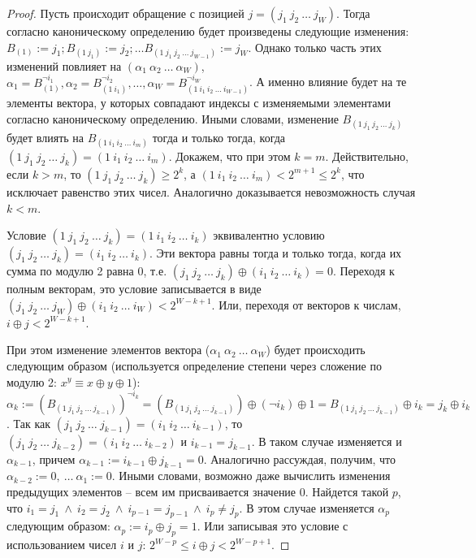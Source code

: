 \theoremtext{\ref{thm_pseudoLRU_invariant}}{\PseudoLRUInvariant}
\begin{proof}
  Пусть происходит обращение с позицией $j = (j_1~j_2~\dots~j_W)$.
  Тогда согласно каноническому определению \PseudoLRU будет
  произведены следующие изменения: $B_{(1)} := j_1; B_{(1~j_1)} :=
  j_2; \dots B_{(1~j_1~j_2~\dots~j_{W-1})} := j_W$. Однако только
  часть этих изменений повлияет на
  $(\alpha_1~\alpha_2~\dots~\alpha_W)$, $\alpha_1 = B_{(1)}^{\neg
  i_1}, \alpha_2 = B_{(1~i_1)}^{\neg i_2}, \dots, \alpha_W =
  B_{(1~i_1~i_2~\dots~i_{W-1})}^{\neg i_W}$. А именно влияние будет
  на те элементы вектора, у которых совпадают индексы с изменяемыми
  элементами согласно каноническому определению. Иными словами,
  изменение $B_{(1~j_1~j_2~\dots~j_k)}$ будет влиять на
  $B_{(1~i_1~i_2~\dots~i_m)}$ тогда и только тогда, когда
  $(1~j_1~j_2~\dots~j_k) = (1~i_1~i_2~\dots~i_m)$. Докажем, что при
  этом $k = m$. Действительно, если $k > m$, то
  $(1~j_1~j_2~\dots~j_k) \geqslant 2^k$, а $(1~i_1~i_2~\dots~i_m) <
  2^{m+1} \leqslant 2^k$, что исключает равенство этих чисел.
  Аналогично доказывается невозможность случая $k < m$.

  Условие $(1~j_1~j_2~\dots~j_k) = (1~i_1~i_2~\dots~i_k)$
  эквивалентно условию $(j_1~j_2~\dots~j_k) = (i_1~i_2~\dots~i_k)$.
  Эти вектора равны тогда и только тогда, когда их сумма по модулю 2
  равна 0, т.е. $(j_1~j_2~\dots~j_k) \oplus (i_1~i_2~\dots~i_k) =
  0$. Переходя к полным векторам, это условие записывается в виде $(j_1~j_2~\dots~j_W) \oplus
  (i_1~i_2~\dots~i_W) < 2^{W-k+1}$. Или, переходя от векторов к
  числам, $i \oplus j < 2^{W-k+1}$.

  При этом изменение элементов вектора
  ($\alpha_1~\alpha_2~\dots~\alpha_W$) будет происходить следующим
  образом (используется определение степени через сложение по модулю
  2: $x^y \equiv x \oplus y \oplus 1$): $\alpha_k :=
  (B_{(1~j_1~j_2~\dots~j_{k-1})})^{\neg i_k} =
  (B_{(1~j_1~j_2~\dots~j_{k-1})}) \oplus (\neg i_k) \oplus 1 =
  B_{(1~j_1~j_2~\dots~j_{k-1})} \oplus i_k = j_k \oplus i_k$. Так
  как $(j_1~j_2~\dots~j_{k-1}) = (i_1~i_2~\dots~i_{k-1})$, то
  $(j_1~j_2~\dots~j_{k-2}) = (i_1~i_2~\dots~i_{k-2})$ и $i_{k-1} =
  j_{k-1}$. В таком случае изменяется и $\alpha_{k-1}$, причем
  $\alpha_{k-1} := i_{k-1} \oplus j_{k-1} = 0$. Аналогично
  рассуждая, получим, что $\alpha_{k-2} := 0,~\dots~\alpha_1 := 0$.
  Иными словами, возможно даже вычислить изменения предыдущих
  элементов -- всем им присваивается значение 0. Найдется такой $p$,
  что $i_1 = j_1~\wedge~i_2 = j_2~\wedge~i_{p-1} =
  j_{p-1}~\wedge~i_p \neq j_p$. В этом случае изменяется
  $\alpha_p$ следующим образом: $\alpha_p := i_p \oplus j_p = 1$.
  Или записывая это условие с использованием чисел $i$ и $j$: $2^{W-p} \leqslant i
  \oplus j < 2^{W-p+1}$.


\end{proof}
